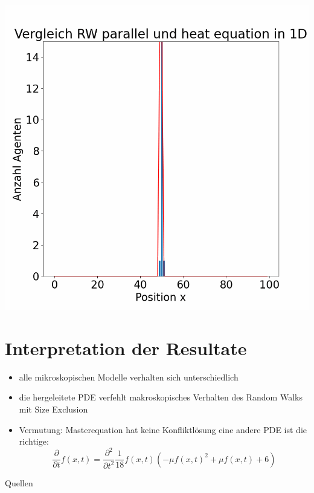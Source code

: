 \documentclass[xcolor=dvipsnames, aspectratio=169]{beamer}
\begin{document}
\begin{frame}
\begin{center}
\end{center}
\end{frame}

\begin{frame}
\begin{center}
\includegraphics[width=0.45\linewidth]{figures/VergleichRW_SE_Heat/VergleichRW_SE_Heat-0.png} 
\end{center}
\end{frame}

\begin{frame}
\begin{center}
\end{center}
\end{frame}

\section{Interpretation der Resultate}
\begin{frame}
	\begin{itemize}
		\item alle mikroskopischen Modelle verhalten sich unterschiedlich
		\item die hergeleitete PDE verfehlt makroskopisches Verhalten des Random Walks mit Size Exclusion
		\item Vermutung: Masterequation hat keine Konfliktlösung eine andere PDE ist die richtige: 
        \begin{equation}
            \frac{\partial}{\partial t} f(x,t) = \frac{\partial ^{2}}{\partial t ^{2}}  \frac{1}{18} f(x,t) \left(-\mu  f(x,t)^2+\mu  f(x,t)+6\right)
        \end{equation}
	\end{itemize} 
\end{frame}
\begin{frame}{Quellen}
    \printbibliography{}
\end{frame}
\end{document}
